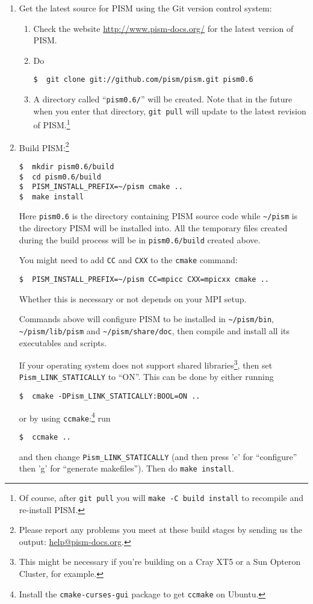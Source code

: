 \documentclass[titlepage,letterpaper,final]{scrartcl}
\begin{document}
\begin{enumerate}
\item Get the latest source for PISM using the Git version control system:
\begin{enumerate}
\item \label{getPISMstep} Check the website \url{http://www.pism-docs.org/} for the latest version of PISM.
\item Do
\begin{verbatim}
$  git clone git://github.com/pism/pism.git pism0.6
\end{verbatim}
\item A directory called ``\texttt{pism0.6/}'' will be created.  Note that in the future when you enter that directory,
  \texttt{git pull} will update to the latest revision of PISM.\footnote{Of course, after \texttt{git pull} you will \texttt{make -C build install} to recompile and re-install PISM.}
\end{enumerate}
\item Build PISM:\footnote{Please report any problems you meet at these build stages by sending us the output: \href{mailto:help@pism-docs.org}{help@pism-docs.org}.}
\begin{verbatim}
$  mkdir pism0.6/build
$  cd pism0.6/build
$  PISM_INSTALL_PREFIX=~/pism cmake ..
$  make install
\end{verbatim}
Here \texttt{pism0.6} is the directory containing PISM source code while \texttt{\textasciitilde/pism} is the directory PISM will be installed into. All the temporary files created during the build process will be in \texttt{pism0.6/build} created above.

You might need to add \texttt{CC} and \texttt{CXX} to the \texttt{cmake}
command:
\begin{verbatim}
$  PISM_INSTALL_PREFIX=~/pism CC=mpicc CXX=mpicxx cmake ..
\end{verbatim}
Whether this is necessary or not depends on your MPI setup.

Commands above will configure PISM to be installed in \texttt{\textasciitilde/pism/bin},
\texttt{\textasciitilde/pism/lib/pism} and
\texttt{\textasciitilde/pism/share/doc}, then compile and install all its
executables and scripts.

If your operating system does not support shared libraries\footnote{This might be necessary if you're building on a Cray XT5 or a Sun Opteron Cluster, for example.}, then set \texttt{Pism_LINK_STATICALLY} to ``ON''. This can be done by
either running
\begin{verbatim}
$  cmake -DPism_LINK_STATICALLY:BOOL=ON ..
\end{verbatim}
or by using \texttt{ccmake}:\footnote{Install the \texttt{cmake-curses-gui} package to get \texttt{ccmake} on Ubuntu.} run
\begin{verbatim}
$  ccmake ..
\end{verbatim}
and then change \texttt{Pism_LINK_STATICALLY} (and then press 'c' for ``configure'' then 'g' for ``generate makefiles'').  Then do \texttt{make install}.


\end{enumerate}
\end{document}

